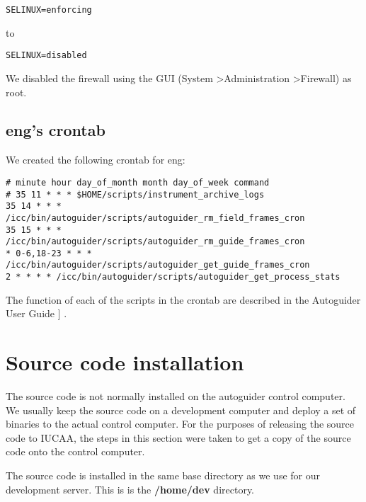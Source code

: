 \documentclass[10pt,a4paper]{article}
\begin{document}
\begin{verbatim}
SELINUX=enforcing
\end{verbatim}

to

\begin{verbatim}
SELINUX=disabled
\end{verbatim}

We disabled the firewall using the GUI (System \textgreater Administration \textgreater Firewall) as root.

\subsection{eng's crontab}

We created the following crontab for eng:
\begin{verbatim}
# minute hour day_of_month month day_of_week command
# 35 11 * * * $HOME/scripts/instrument_archive_logs
35 14 * * * /icc/bin/autoguider/scripts/autoguider_rm_field_frames_cron
35 15 * * * /icc/bin/autoguider/scripts/autoguider_rm_guide_frames_cron
* 0-6,18-23 * * * /icc/bin/autoguider/scripts/autoguider_get_guide_frames_cron
2 * * * * /icc/bin/autoguider/scripts/autoguider_get_process_stats
\end{verbatim}

The function of each of the scripts in the crontab are described in the Autoguider User Guide ]
\cite{bib:autoguideruserguide}.

\section{Source code installation}

The source code is not normally installed on the autoguider control computer. We usually keep the source code on a development computer and deploy a set of binaries to the actual control computer. For the purposes of releasing the source code to IUCAA, the steps in this section were taken to get a copy of the source code onto the control computer.

The source code is installed in the same base directory as we use for our development server. This is is the {\bf /home/dev} directory.
\end{document}
